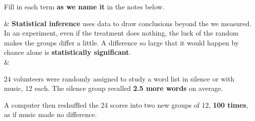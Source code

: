 \documentclass[12pt]{article}
\begin{document}

\vspace{2pt}

\boxguard[16]
\begin{vocabbox}
\small
Fill in each term \textbf{as we name it} in the notes below.
\par
{}
\par
{}
\par
{}
\par
{}
\par
\end{vocabbox}

\small
\begin{guidednotes}
 &
\textbf{Statistical inference} uses data to draw conclusions beyond the \blank{2.6cm} we
measured. In an experiment, even if the treatment does nothing, the luck of the random
\blank{2.0cm} makes the groups differ a little. A difference so large that it would
\blank{1.4cm} happen by chance alone is \textbf{statistically significant}.
\\
& \begin{minipage}[c]{0.44\linewidth}\raggedright
24 volunteers were randomly assigned to study a word list in silence or with music, 12 each.
The silence group recalled \textbf{2.5 more words} on average.\par\vspace{3pt}
A computer then reshuffled the 24 scores into two new groups of 12, \textbf{100 times}, as if
music made no difference.
\end{minipage}\hfill
\begin{minipage}[c]{0.54\linewidth}\centering
{}
\end{minipage}
\end{guidednotes}
\end{document}
